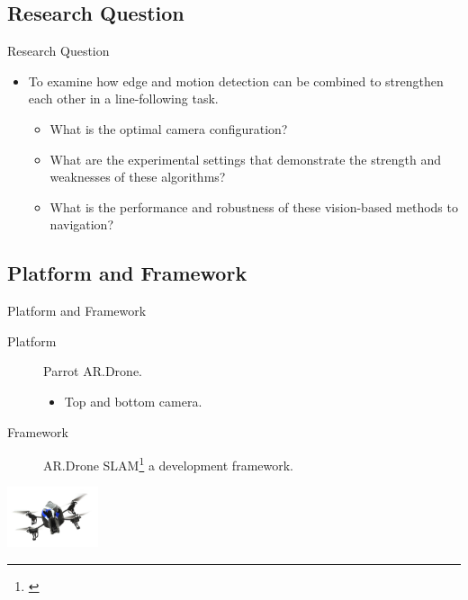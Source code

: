 \documentclass{beamer}
\begin{document}
\subsection{Research Question}
\begin{frame}
\begin{block}{Research Question}
\begin{itemize}
\item To examine how edge and motion detection can be combined to strengthen each other in a line-following task.
\begin{itemize}
\item What is the optimal camera configuration?
\item What are the experimental settings that demonstrate the strength and weaknesses of these algorithms?
\item What is the performance and robustness of these vision-based methods to navigation?
\end{itemize}
\end{itemize}
\end{block}
\end{frame}

\subsection{Platform and Framework}
\begin{frame}
\begin{block}{Platform and Framework}
\begin{description}
\item[Platform] Parrot AR.Drone.
\begin{itemize}
\item Top and bottom camera.
\end{itemize}
\item[Framework] AR.Drone SLAM\footnote{\cite{Dijkshoorn2012}} a development framework.
\end{description}
\end{block}
\begin{center}
\includegraphics[width = 0.2\textwidth]{images/ardrone.jpg}
\end{center}
\end{frame}
\end{document}
